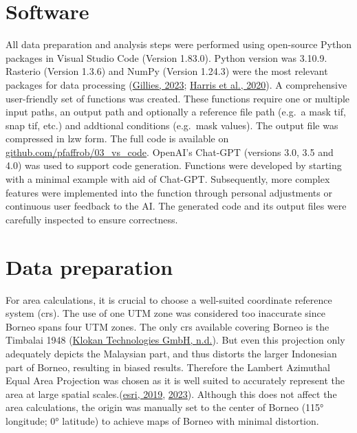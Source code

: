 \documentclass[
  letterpaper,
  DIV=11,
  numbers=noendperiod]{scrreprt}
\begin{document}
\hypertarget{software}{%
\section{Software}\label{software}}

All data preparation and analysis steps were performed using open-source
Python packages in Visual Studio Code (Version 1.83.0). Python version
was 3.10.9. Rasterio (Version 1.3.6) and NumPy (Version 1.24.3) were the
most relevant packages for data processing
(\protect\hyperlink{ref-gilliesRasterioDocumentation2023}{Gillies,
2023}; \protect\hyperlink{ref-harrisArrayProgrammingNumPy2020}{Harris et
al., 2020}). A comprehensive user-friendly set of functions was created.
These functions require one or multiple input paths, an output path and
optionally a reference file path (e.g.~a mask tif, snap tif, etc.) and
addtional conditions (e.g.~mask values). The output file was compressed
in lzw form. The full code is available on
\href{https://github.com/pfaffrob/03_vs_code}{github.com/pfaffrob/03\_vs\_code}.
OpenAI's Chat-GPT (versions 3.0, 3.5 and 4.0) was used to support code
generation. Functions were developed by starting with a minimal example
with aid of Chat-GPT. Subsequently, more complex features were
implemented into the function through personal adjustments or continuous
user feedback to the AI. The generated code and its output files were
carefully inspected to ensure correctness.

\hypertarget{data-preparation}{%
\section{Data preparation}\label{data-preparation}}

For area calculations, it is crucial to choose a well-suited coordinate
reference system (crs). The use of one UTM zone was considered too
inaccurate since Borneo spans four UTM zones. The only crs available
covering Borneo is the Timbalai 1948
(\protect\hyperlink{ref-klokantechnologiesgmbhTimbalai1948RSO}{Klokan
Technologies GmbH, n.d.}). But even this projection only adequately
depicts the Malaysian part, and thus distorts the larger Indonesian part
of Borneo, resulting in biased results. Therefore the Lambert Azimuthal
Equal Area Projection was chosen as it is well suited to accurately
represent the area at large spatial
scales.(\protect\hyperlink{ref-esriQuick_Notes_on_Map_Projections_in_ArcGIS_nov2019Pdf2019}{esri,
2019}, \protect\hyperlink{ref-esriLambertAzimuthalEqualarea2023}{2023}).
Although this does not affect the area calculations, the origin was
manually set to the center of Borneo (115° longitude; 0° latitude) to
achieve maps of Borneo with minimal distortion.
\end{document}
